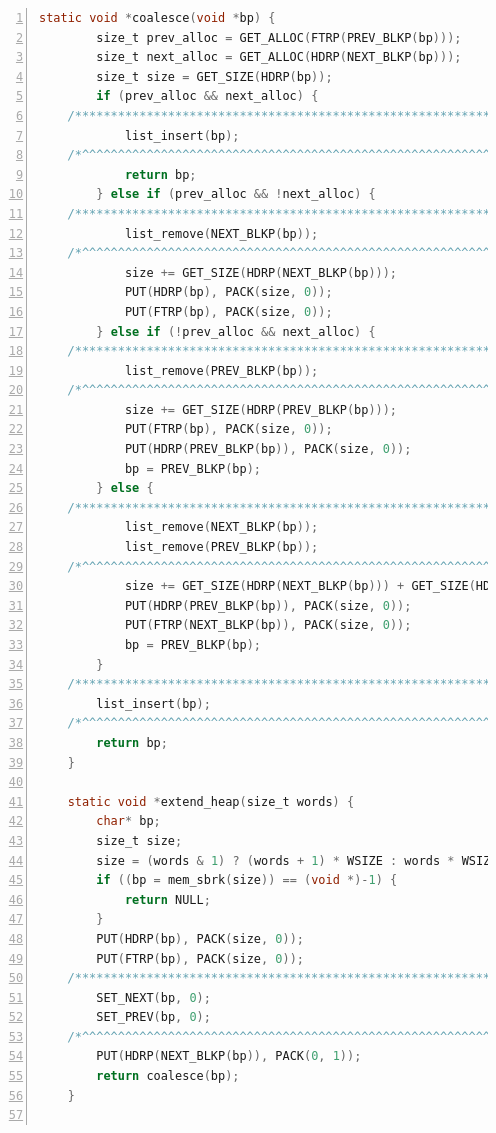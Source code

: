 \documentclass{article}
\begin{document}
\begin{lstlisting}[xleftmargin = 4em,xrightmargin = 3em, aboveskip = 1em, numbers = left, language = C]
    static void *coalesce(void *bp) {
        size_t prev_alloc = GET_ALLOC(FTRP(PREV_BLKP(bp)));
        size_t next_alloc = GET_ALLOC(HDRP(NEXT_BLKP(bp)));
        size_t size = GET_SIZE(HDRP(bp));
        if (prev_alloc && next_alloc) {
    /****************************************************************************/
            list_insert(bp);
    /*^^^^^^^^^^^^^^^^^^^^^^^^^^^^^^^^^^^^^^^^^^^^^^^^^^^^^^^^^^^^^^^^^^^^^^^^^^*/
            return bp;
        } else if (prev_alloc && !next_alloc) {
    /****************************************************************************/
            list_remove(NEXT_BLKP(bp));
    /*^^^^^^^^^^^^^^^^^^^^^^^^^^^^^^^^^^^^^^^^^^^^^^^^^^^^^^^^^^^^^^^^^^^^^^^^^^*/
            size += GET_SIZE(HDRP(NEXT_BLKP(bp)));
            PUT(HDRP(bp), PACK(size, 0));
            PUT(FTRP(bp), PACK(size, 0));
        } else if (!prev_alloc && next_alloc) {
    /****************************************************************************/
            list_remove(PREV_BLKP(bp));
    /*^^^^^^^^^^^^^^^^^^^^^^^^^^^^^^^^^^^^^^^^^^^^^^^^^^^^^^^^^^^^^^^^^^^^^^^^^^*/
            size += GET_SIZE(HDRP(PREV_BLKP(bp)));
            PUT(FTRP(bp), PACK(size, 0));
            PUT(HDRP(PREV_BLKP(bp)), PACK(size, 0));
            bp = PREV_BLKP(bp);
        } else {
    /****************************************************************************/
            list_remove(NEXT_BLKP(bp));
            list_remove(PREV_BLKP(bp));
    /*^^^^^^^^^^^^^^^^^^^^^^^^^^^^^^^^^^^^^^^^^^^^^^^^^^^^^^^^^^^^^^^^^^^^^^^^^^*/
            size += GET_SIZE(HDRP(NEXT_BLKP(bp))) + GET_SIZE(HDRP(PREV_BLKP(bp)));
            PUT(HDRP(PREV_BLKP(bp)), PACK(size, 0));
            PUT(FTRP(NEXT_BLKP(bp)), PACK(size, 0));
            bp = PREV_BLKP(bp);
        }
    /****************************************************************************/
        list_insert(bp);
    /*^^^^^^^^^^^^^^^^^^^^^^^^^^^^^^^^^^^^^^^^^^^^^^^^^^^^^^^^^^^^^^^^^^^^^^^^^^*/
        return bp;
    }
    
    static void *extend_heap(size_t words) {
        char* bp;
        size_t size;
        size = (words & 1) ? (words + 1) * WSIZE : words * WSIZE;
        if ((bp = mem_sbrk(size)) == (void *)-1) {
            return NULL;
        }
        PUT(HDRP(bp), PACK(size, 0));
        PUT(FTRP(bp), PACK(size, 0));
    /****************************************************************************/
        SET_NEXT(bp, 0);
        SET_PREV(bp, 0);
    /*^^^^^^^^^^^^^^^^^^^^^^^^^^^^^^^^^^^^^^^^^^^^^^^^^^^^^^^^^^^^^^^^^^^^^^^^^^*/
        PUT(HDRP(NEXT_BLKP(bp)), PACK(0, 1));
        return coalesce(bp);
    }


\end{lstlisting}
\end{document}
